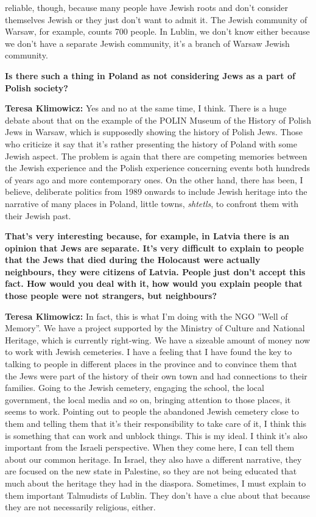 reliable, though, because many people have Jewish roots and don't consider themselves Jewish or they just don't want to admit it. The Jewish community of Warsaw, for example, counts 700 people. In Lublin, we don’t know either because we don't have a separate Jewish community, it's a branch of Warsaw Jewish community.  

\textbf{Is there such a thing in Poland as not considering Jews as a part of Polish society?} 

\textbf{Teresa Klimowicz:} Yes and no at the same time, I think. There is a huge debate about that on the example of the POLIN Museum of the History of Polish Jews in Warsaw, which is supposedly showing the history of Polish Jews. Those who criticize it say that it's rather presenting the history of Poland with some Jewish aspect. The problem is again that there are competing memories between the Jewish experience and the Polish experience concerning events both hundreds of years ago and more contemporary ones. On the other hand, there has been, I believe, deliberate politics from 1989 onwards to include Jewish heritage into the narrative of many places in Poland, little towns, \textit{shtetls}, to confront them with their Jewish past. 

\textbf{That’s very interesting because, for example, in Latvia there is an opinion that Jews are separate. It’s very difficult to explain to people that the Jews that died during the Holocaust were actually neighbours, they were citizens of Latvia. People just don't accept this fact. How would you deal with it, how would you explain people that those people were not strangers, but neighbours?} 

\textbf{Teresa Klimowicz:} In fact, this is what I'm doing with the NGO ''Well of Memory''. We have a project supported by the Ministry of Culture and National Heritage, which is currently right-wing. We have a sizeable amount of money now to work with Jewish cemeteries. I have a feeling that I have found the key to talking to people in different places in the province and to convince them that the Jews were part of the history of their own town and had connections to their families. Going to the Jewish cemetery, engaging the school, the local government, the local media and so on, bringing attention to those places, it seems to work. Pointing out to people the abandoned Jewish cemetery close to them and telling them that it's their responsibility to take care of it, I think this is something that can work and unblock things. This is my ideal. I think it's also important from the Israeli perspective. When they come here, I can tell them about our common heritage. In Israel, they also have a different narrative, they are focused on the new state in Palestine, so they are not being educated that much about the heritage they had in the diaspora. Sometimes, I must explain to them important Talmudists of Lublin. They don't have a clue about that because they are not necessarily religious, either. 

